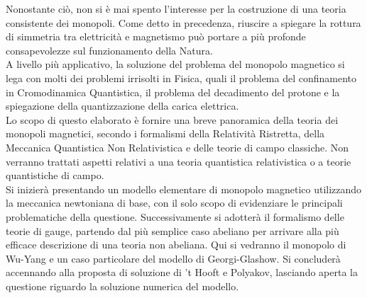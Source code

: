 Nonostante ciò, non si è mai spento l'interesse per la costruzione di una
teoria consistente dei monopoli. Come detto in precedenza, riuscire a spiegare
la rottura di simmetria tra elettricità e magnetismo può
portare a più profonde consapevolezze sul funzionamento della Natura.\\

A livello più applicativo, la soluzione del problema del monopolo magnetico si
lega con molti dei problemi irrisolti in Fisica, quali il problema del confinamento
in Cromodinamica Quantistica, il problema del decadimento del protone e la spiegazione
della quantizzazione della carica elettrica.\\

Lo scopo di questo elaborato è fornire una breve panoramica della teoria dei monopoli
magnetici, secondo i formalismi della Relatività Ristretta, della Meccanica Quantistica
Non Relativistica e delle teorie di campo classiche. Non verranno trattati aspetti
relativi a una teoria quantistica relativistica o a teorie quantistiche di campo.\\

Si inizierà presentando un modello elementare di monopolo magnetico utilizzando
la meccanica newtoniana di base, con il solo scopo di evidenziare le principali
problematiche della questione. Successivamente si adotterà il formalismo delle
teorie di gauge, partendo dal più semplice caso abeliano per arrivare alla
più efficace descrizione di una teoria non abeliana. Qui si vedranno il monopolo
di Wu-Yang e un caso particolare del modello di Georgi-Glashow.
Si concluderà accennando alla proposta di soluzione di 't Hooft e Polyakov, lasciando
aperta la questione riguardo la soluzione numerica del modello.
